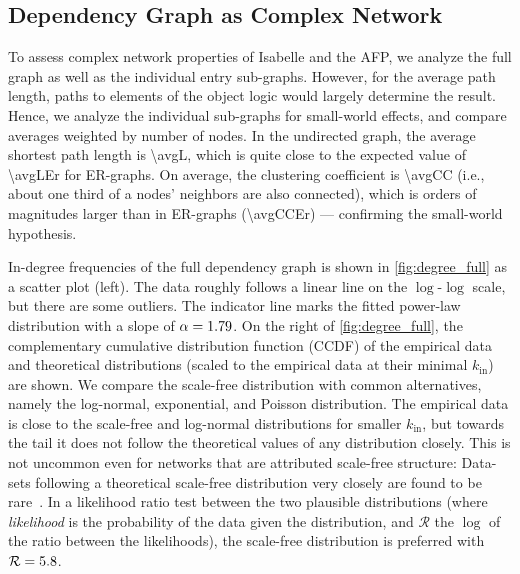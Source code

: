 \subsection{Dependency Graph as Complex Network}
To assess complex network properties of Isabelle and the AFP,
we analyze the full graph as well as the individual entry sub-graphs.
However, for the average path length, paths to elements of the object logic would largely determine the result.
Hence, we analyze the individual sub-graphs for small-world effects, and compare averages weighted by number of nodes.
In the undirected graph, the average shortest path length is \num[round-mode=places,round-precision=1]{\avgL},
which is quite close to the expected value of \num[round-mode=places,round-precision=1]{\avgLEr} for ER-graphs.
On average, the clustering coefficient is \num[round-mode=figures,round-precision=2]{\avgCC}
(i.e., about one third of a nodes' neighbors are also connected), which is orders of magnitudes larger than in ER-graphs (\num[round-mode=figures,round-precision=2]{\avgCCEr}) ---
confirming the small-world hypothesis.



In-degree frequencies of the full dependency graph is shown in \autoref{fig:degree_full} as a scatter plot (left).
The data roughly follows a linear line on the $\log$-$\log$ scale,
but there are some outliers.
The indicator line marks the fitted power-law distribution with a slope of $\alpha = \num[round-mode=places,round-precision=2]{\degreeFullAlpha}$.
On the right of \autoref{fig:degree_full},
the complementary cumulative distribution function (CCDF) of the empirical data and theoretical distributions (scaled to the empirical data at their minimal $k_\text{in}$) are shown.
We compare the scale-free distribution with common alternatives, namely the log-normal, exponential, and Poisson distribution.
The empirical data is close to the scale-free and log-normal distributions for smaller $k_\text{in}$,
but towards the tail it does not follow the theoretical values of any distribution closely.
This is not uncommon even for networks that are attributed scale-free structure:
Data-sets following a theoretical scale-free distribution very closely are found to be rare~\cite{ScalefreeRare2019Broido}.
In a likelihood ratio test between the two plausible distributions
(where \emph{likelihood} is the probability of the data given the distribution, and $\mathcal{R}$ the $\log$ of the ratio between the likelihoods),
the scale-free distribution is preferred with $\mathcal{R}=\num[round-mode=places,round-precision=1]{\degreeFullPlLnR}$.

